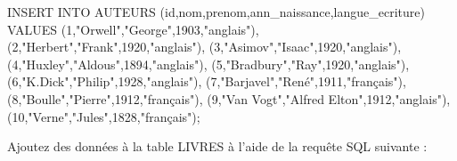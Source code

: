\documentclass[
  letterpaper,
  DIV=11,
  numbers=noendperiod]{scrartcl}
\newenvironment{Shaded}{\begin{snugshade}}{\end{snugshade}}
\newcommand{\DecValTok}[1]{\textcolor[rgb]{0.68,0.00,0.00}{#1}}
\newcommand{\KeywordTok}[1]{\textcolor[rgb]{0.00,0.23,0.31}{#1}}
\newcommand{\NormalTok}[1]{\textcolor[rgb]{0.00,0.23,0.31}{#1}}
\newcommand{\OtherTok}[1]{\textcolor[rgb]{0.00,0.23,0.31}{#1}}
\begin{document}
\begin{enumerate}
\begin{Shaded}
\begin{Highlighting}[]
\KeywordTok{INSERT} \KeywordTok{INTO}\NormalTok{ AUTEURS}
\NormalTok{(}\KeywordTok{id}\NormalTok{,nom,prenom,ann\_naissance,langue\_ecriture)}
\KeywordTok{VALUES}
\NormalTok{(}\DecValTok{1}\NormalTok{,}\OtherTok{"Orwell"}\NormalTok{,}\OtherTok{"George"}\NormalTok{,}\DecValTok{1903}\NormalTok{,}\OtherTok{"anglais"}\NormalTok{),}
\NormalTok{(}\DecValTok{2}\NormalTok{,}\OtherTok{"Herbert"}\NormalTok{,}\OtherTok{"Frank"}\NormalTok{,}\DecValTok{1920}\NormalTok{,}\OtherTok{"anglais"}\NormalTok{),}
\NormalTok{(}\DecValTok{3}\NormalTok{,}\OtherTok{"Asimov"}\NormalTok{,}\OtherTok{"Isaac"}\NormalTok{,}\DecValTok{1920}\NormalTok{,}\OtherTok{"anglais"}\NormalTok{),}
\NormalTok{(}\DecValTok{4}\NormalTok{,}\OtherTok{"Huxley"}\NormalTok{,}\OtherTok{"Aldous"}\NormalTok{,}\DecValTok{1894}\NormalTok{,}\OtherTok{"anglais"}\NormalTok{),}
\NormalTok{(}\DecValTok{5}\NormalTok{,}\OtherTok{"Bradbury"}\NormalTok{,}\OtherTok{"Ray"}\NormalTok{,}\DecValTok{1920}\NormalTok{,}\OtherTok{"anglais"}\NormalTok{),}
\NormalTok{(}\DecValTok{6}\NormalTok{,}\OtherTok{"K.Dick"}\NormalTok{,}\OtherTok{"Philip"}\NormalTok{,}\DecValTok{1928}\NormalTok{,}\OtherTok{"anglais"}\NormalTok{),}
\NormalTok{(}\DecValTok{7}\NormalTok{,}\OtherTok{"Barjavel"}\NormalTok{,}\OtherTok{"René"}\NormalTok{,}\DecValTok{1911}\NormalTok{,}\OtherTok{"français"}\NormalTok{),}
\NormalTok{(}\DecValTok{8}\NormalTok{,}\OtherTok{"Boulle"}\NormalTok{,}\OtherTok{"Pierre"}\NormalTok{,}\DecValTok{1912}\NormalTok{,}\OtherTok{"français"}\NormalTok{),}
\NormalTok{(}\DecValTok{9}\NormalTok{,}\OtherTok{"Van Vogt"}\NormalTok{,}\OtherTok{"Alfred Elton"}\NormalTok{,}\DecValTok{1912}\NormalTok{,}\OtherTok{"anglais"}\NormalTok{),}
\NormalTok{(}\DecValTok{10}\NormalTok{,}\OtherTok{"Verne"}\NormalTok{,}\OtherTok{"Jules"}\NormalTok{,}\DecValTok{1828}\NormalTok{,}\OtherTok{"français"}\NormalTok{);}
\end{Highlighting}
\end{Shaded}

  Ajoutez des données à la table LIVRES à l'aide de la requête SQL
  suivante :


\end{enumerate}
\end{document}
